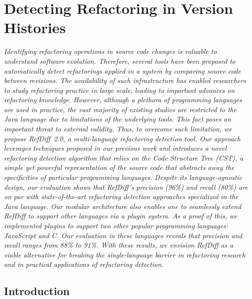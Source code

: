 \chapter{Detecting Refactoring in Version Histories}
\label{ChTse}

\noindent\textit{Identifying refactoring operations in source code changes is valuable to understand software evolution.
Therefore, several tools have been proposed to automatically detect refactorings applied in a system by comparing source code between revisions.
The availability of such infrastructure has enabled researchers to study refactoring practice in large scale, leading to important advances on refactoring knowledge.
However, although a plethora of programming languages are used in practice, the vast majority of existing studies are restricted to the Java language due to limitations of the underlying tools.
This fact poses an important threat to external validity.
Thus, to overcome such limitation, we propose RefDiff~2.0, a multi-language refactoring detection tool.
Our approach leverages techniques proposed in our previous work and introduces a novel refactoring detection algorithm that relies on the Code Structure Tree (CST), a simple yet powerful representation of the source code that abstracts away the specificities of particular programming languages.
Despite its language-agnostic design, our evaluation shows that RefDiff's precision (96\%) and recall (80\%) are on par with state-of-the-art refactoring detection approaches specialized in the Java language.
Our modular architecture also enables one to seamlessly extend RefDiff to support other languages via a plugin system.
As a proof of this, we implemented plugins to support two other popular programming languages: JavaScript and C.
Our evaluation in these languages reveals that precision and recall ranges from 88\% to 91\%.
With these results, we envision RefDiff as a viable alternative for breaking the single-language barrier in refactoring research and in practical applications of refactoring detection.
}

\section{Introduction}



